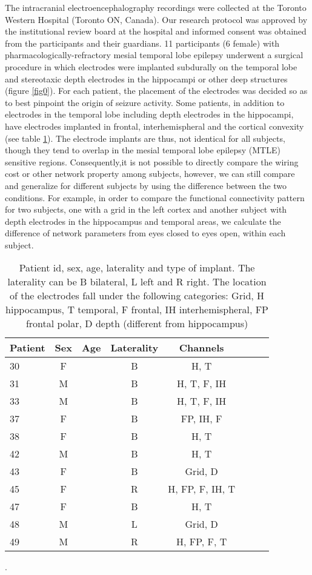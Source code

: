 \documentclass[11pt, onecolumn]{article}
\begin{document}
The intracranial electroencephalography recordings were collected at the Toronto Western Hospital (Toronto ON, Canada). Our research protocol was approved by the institutional review board at the hospital and informed consent was obtained from the participants and their guardians. 11 participants (6 female) with pharmacologically-refractory mesial temporal lobe epilepsy underwent a surgical procedure in which electrodes were implanted subdurally on the temporal lobe and stereotaxic depth electrodes in the hippocampi or other deep structures (figure \ref{fig0}).
For each patient, the placement of the electrodes was decided so as to
best pinpoint the origin of seizure activity. Some patients, in addition to electrodes in the temporal lobe including depth electrodes in the hippocampi, have   electrodes implanted in frontal, interhemispheral and the cortical convexity (see table \ref{Table:demog}). The electrode implants are thus, not identical for all subjects, though they tend to overlap in the mesial temporal lobe epilepsy (MTLE) sensitive regions. Consequently,it is not possible to directly compare the wiring cost or other network property among subjects, however, we can still compare and generalize for different subjects by using the difference between the two conditions. For example, in order to compare the functional connectivity pattern for two subjects, one with a grid in the left cortex and another subject with depth electrodes in the hippocampus and temporal areas, we calculate the difference of network parameters from eyes closed to eyes open, within each subject.

\begin{table}
\centering
\begin{tabular}{l*{6}{c}r}
Patient & Sex & Age & Laterality & Channels  \\
\hline
30 & F &  & B & H, T \\
31 & M &  & B & H, T, F, IH \\
33 & M &  & B & H, T, F, IH \\
37 & F &  & B & FP, IH, F  \\
38 & F &  & B & H, T \\
42 & M &  & B & H, T  \\ %
43 & F &  & B & Grid, D \\%
45 & F &  & R & H, FP, F, IH, T   \\
47 & F &  & B & H, T  \\
48 & M &  & L & Grid, D \\ %
49 & M &  & R & H, FP, F, T   \\
\end{tabular}
\caption{\label{Table:demog} Patient id, sex, age, laterality and type of implant. 
The laterality can be B bilateral, L left and R right. The location of the electrodes fall under the following categories: Grid, H hippocampus, T temporal, F frontal, IH interhemispheral, FP frontal polar, D depth (different from hippocampus)}.
\end{table}
\end{document}
